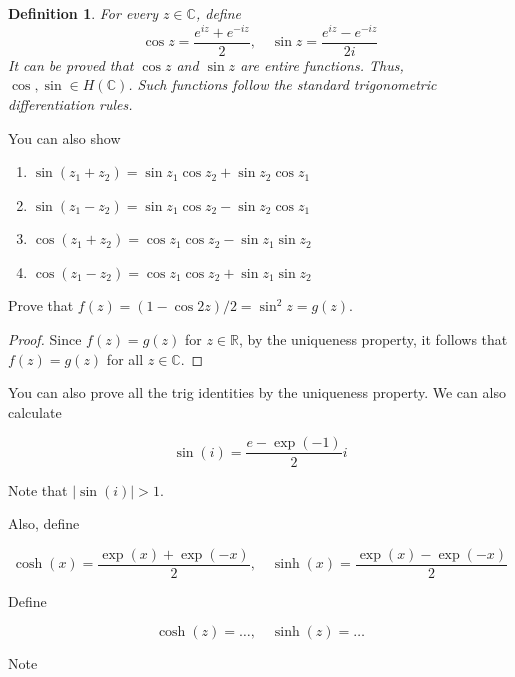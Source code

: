 \documentclass{article}
\newtheorem{definition}[theorem]{Definition}
\newtheorem{one minute paper}[theorem]{One Minute Paper}
\begin{document}
\begin{definition}
    For every $z \in \mathbb{C}$, define 
    \begin{equation}
        \cos z = \frac{e^{iz} + e^{-iz}}{2}, \quad \sin z = \frac{e^{iz} - e^{-iz}}{2i}
    \end{equation}
    It can be proved that $\cos z$ and $\sin z$ are entire functions. Thus,  $\cos, \sin \in H(\mathbb{C})$. Such functions follow the standard trigonometric differentiation rules. 
\end{definition}

You can also show 

\begin{enumerate}
    \item $\sin(z_1 + z_2) = \sin z_1 \cos z_2 + \sin z_2 \cos z_1$
    \item $\sin(z_1 - z_2) = \sin z_1 \cos z_2 - \sin z_2 \cos z_1$
    \item $\cos(z_1 + z_2) = \cos z_1 \cos z_2 - \sin z_1 \sin z_2$
    \item $\cos(z_1 - z_2) = \cos z_1 \cos z_2 + \sin z_1 \sin z_2$
\end{enumerate}

Prove that $f(z) = (1 - \cos 2z )/2 = \sin^2 z = g(z)$.

\begin{proof}
    Since $f(z) = g(z)$ for $z \in \mathbb{R}$, by the uniqueness property, it follows that $f(z) = g(z)$ for all $z \in \mathbb{C}$. 
\end{proof}

You can also prove all the trig identities by the uniqueness property. We can also calculate 

\begin{equation}
    \sin(i) = \frac{e - \exp(-1)}{2}i
\end{equation}

Note that $|\sin(i)| > 1$. 

Also, define 

\begin{equation}
    \cosh(x) = \frac{\exp(x) + \exp(-x)}{2}, \quad \sinh(x) = \frac{\exp(x) - \exp(-x)}{2}
\end{equation}

Define 

\begin{equation}
    \cosh(z) = \dots, \quad \sinh(z) = \dots
\end{equation}

Note 
\end{document}
